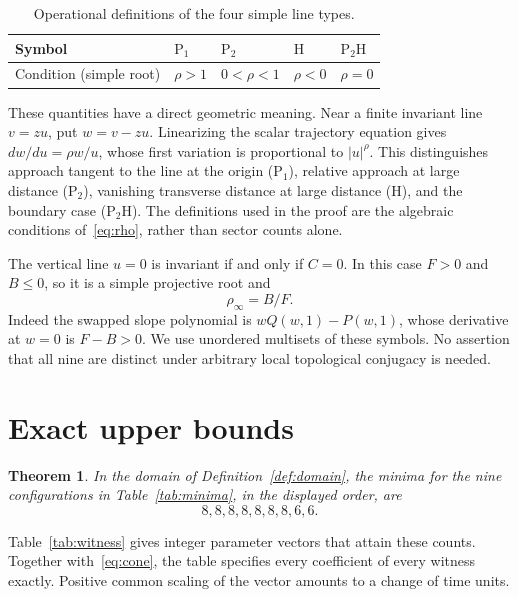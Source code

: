 \documentclass[11pt,a4paper]{article}
\newtheorem{theorem}{Theorem}
\theoremstyle{definition}\newtheorem{definition}[theorem]{Definition}
\newcommand{\HH}{\mathrm H}
\newcommand{\PP}{\mathrm P}
\begin{document}
\begin{table}[ht]
\centering
\begin{tabular}{@{}lllll@{}}
\toprule
Symbol & $\PP_1$ & $\PP_2$ & $\HH$ & $\PP_2\HH$\\
\midrule
Condition (simple root) & $\rho>1$ & $0<\rho<1$ & $\rho<0$ & $\rho=0$\\
\bottomrule
\end{tabular}
\caption{Operational definitions of the four simple line types.}
\label{tab:types}
\end{table}

These quantities have a direct geometric meaning. Near a finite invariant
line $v=zu$, put $w=v-zu$. Linearizing the scalar trajectory equation gives
$dw/du=\rho w/u$, whose first variation is proportional to
$|u|^\rho$. This distinguishes approach tangent to the line at the origin
($\PP_1$), relative approach at large distance ($\PP_2$), vanishing
transverse distance at large distance ($\HH$), and the boundary case
($\PP_2\HH$). The definitions used in the proof are the algebraic
conditions of~\eqref{eq:rho}, rather than sector counts alone.

The vertical line $u=0$ is invariant if and only if $C=0$. In this case
$F>0$ and $B\leq0$, so it is a simple projective root and
\begin{equation}\label{eq:infinity}
 \rho_\infty=B/F.
\end{equation}
Indeed the swapped slope polynomial is
$wQ(w,1)-P(w,1)$, whose derivative at $w=0$ is $F-B>0$.
We use unordered multisets of these symbols. No assertion that all nine
are distinct under arbitrary local topological conjugacy is needed.

\section{Exact upper bounds}
\begin{theorem}\label{thm:main}
In the domain of Definition~\ref{def:domain}, the minima for the nine
configurations in Table~\ref{tab:minima}, in the displayed order, are
\[
 8,8,8,8,8,8,8,6,6.
\]
\end{theorem}
Table~\ref{tab:witness} gives integer parameter vectors that attain these
counts. Together with~\eqref{eq:cone}, the table specifies every coefficient
of every witness exactly. Positive common scaling of the vector amounts
to a change of time units.
\end{document}
